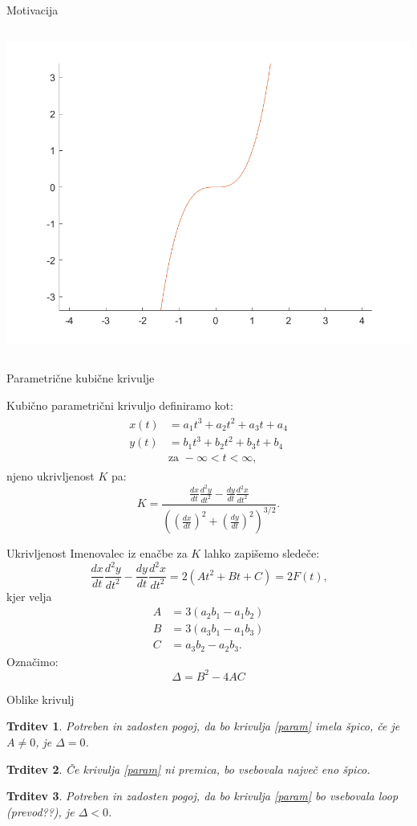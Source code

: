 \documentclass{beamer} %
\newtheorem{trditev}{Trditev}
\begin{document}
\begin{frame}{Motivacija}
\begin{columns}[t]
	\includegraphics[width=0.7\columnwidth]{no_sing.png}
\end{columns}
\end{frame}

\begin{frame} {Parametrične kubične krivulje}

Kubično parametrični krivuljo definiramo kot:
	\begin{align}
	\begin{split}
	x(t) &= a_1t^3+a_2t^2+a_3t+a_4 \\
	y(t) &= b_1t^3+b_2t^2+b_3t+b_4 \\
	&\text {za } -\infty < t < \infty \text{,}
	\label{param}
	\end{split}
	\end{align}
	njeno ukrivljenost $K$ pa:
	\[K = \frac{\frac{dx}{dt}\frac{d^2y}{dt^2} - \frac{dy}{dt}\frac{d^2x}{dt^2}}{\left((\frac{dx}{dt})^{2} +(\frac{dy}{dt})^2\right)^{3/2}}\text{.}\]

\end{frame}


\begin{frame}{Ukrivljenost}
Imenovalec iz enačbe za $K$ lahko zapišemo sledeče:
\[\frac{dx}{dt}\frac{d^2y}{dt^2} - \frac{dy}{dt}\frac{d^2x}{dt^2} = 2(At^2 + Bt +C) = 2F(t) \text{,}\]
kjer velja
	\begin{align*}
	A &= 3(a_2b_1-a_1b_2)\\
	B &= 3(a_3b_1 -a_1b_3) \\
	C &= a_3b_2-a_2b_3 \text{.}
	\end{align*}
Označimo:
\[\Delta = B^2- 4AC\]
\end{frame}

\begin{frame}{Oblike krivulj}
	\begin{trditev}
		Potreben in zadosten pogoj, da bo krivulja \eqref{param} imela špico, če je $A \neq 0$, je $\Delta = 0$.
	\end{trditev}
	\begin{trditev}
		Če krivulja \eqref{param} ni premica, bo vsebovala največ eno špico.
	\end{trditev}
	\begin{trditev}
		Potreben in zadosten pogoj, da bo krivulja \eqref{param} bo vsebovala loop (prevod??), je $\Delta <0$.
	\end{trditev}
		
\end{frame}
\end{document}
